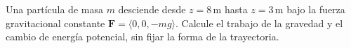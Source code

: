Una partícula de masa $m$ desciende desde $z=8\,\mathrm m$ hasta $z=3\,\mathrm m$ bajo la fuerza gravitacional constante $\mathbf{F}=\langle0,0,-mg\rangle$. Calcule el trabajo de la gravedad y el cambio de energía potencial, sin fijar la forma de la trayectoria.
